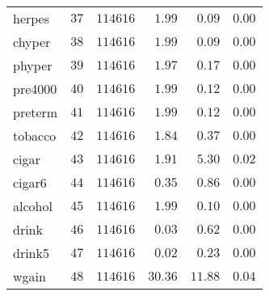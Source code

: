 \begin{table}[!tbp]
\begin{center}
\begin{tabular}{lrrrrr}
herpes&$37$&$114616$&$   1.99$&$  0.09$&$0.00$\tabularnewline
chyper&$38$&$114616$&$   1.99$&$  0.09$&$0.00$\tabularnewline
phyper&$39$&$114616$&$   1.97$&$  0.17$&$0.00$\tabularnewline
pre4000&$40$&$114616$&$   1.99$&$  0.12$&$0.00$\tabularnewline
preterm&$41$&$114616$&$   1.99$&$  0.12$&$0.00$\tabularnewline
tobacco&$42$&$114616$&$   1.84$&$  0.37$&$0.00$\tabularnewline
cigar&$43$&$114616$&$   1.91$&$  5.30$&$0.02$\tabularnewline
cigar6&$44$&$114616$&$   0.35$&$  0.86$&$0.00$\tabularnewline
alcohol&$45$&$114616$&$   1.99$&$  0.10$&$0.00$\tabularnewline
drink&$46$&$114616$&$   0.03$&$  0.62$&$0.00$\tabularnewline
drink5&$47$&$114616$&$   0.02$&$  0.23$&$0.00$\tabularnewline
wgain&$48$&$114616$&$  30.36$&$ 11.88$&$0.04$\tabularnewline
\hline
\end{tabular}
\end{center}
\end{table}

